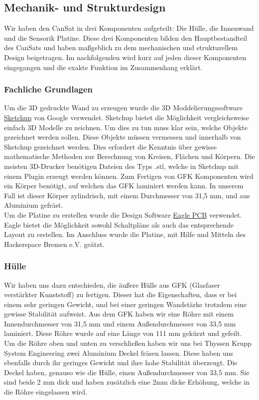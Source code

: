 \subsection{Mechanik- und Strukturdesign}

Wir haben den CanSat in drei Komponenten aufgeteilt: Die Hülle, die Innenwand und die Sensorik Platine. Diese drei Komponenten bilden den Hauptbestandteil des CanSats und haben maßgeblich zu dem mechanischen und strukturellem Design beigetragen. Im nachfolgenden wird kurz auf jeden dieser Komponenten eingegangen und die exakte Funktion im Zusammenhang erklärt.

\subsubsection{Fachliche Grundlagen}
Um die 3D gedruckte Wand zu erzeugen wurde die 3D Moddelierungssoftware \href{http://www.sketchup.com/de} {Sketchup} von Google verwendet. Sketchup bietet die Möglichkeit vergleichsweise einfach 3D Modelle zu zeichnen. Um dies zu tun muss klar sein, welche Objekte gezeichnet werden sollen. Diese Objekte müssen vermessen und innerhalb von Sketchup gezeichnet werden. Dies erfordert die Kenntnis über gewisse mathematische Methoden zur Berechnung von Kreisen, Flächen und Körpern. Die meisten 3D-Drucker benötigen Dateien des Typs .stl, welche in Sketchup mit einem Plugin erzeugt werden können.
Zum Fertigen von GFK Komponenten wird ein Körper benötigt, auf welchen das GFK laminiert werden kann. In unserem Fall ist dieser Körper zylindrisch, mit einem Durchmesser von 31,5 mm, und aus Aluminium gefräst. \\
Um die Platine zu erstellen wurde die Design Software \href{http://www.cadsoft.de/eagle-pcb-design-software/} {Eagle PCB} verwendet. Eagle bietet die Möglichkeit sowohl Schaltpläne als auch das entsprechende Layout zu erstellen. Im Anschluss wurde die Platine, mit Hilfe und Mitteln des Hackerspace Bremen e.V. geätzt.

\subsubsection{Hülle}
Wir haben uns dazu entschieden, die äußere Hülle aus GFK (Glasfaser verstärkter Kunststoff) zu fertigen. Dieser hat die Eigenschaften, dass er bei einem sehr geringen Gewicht, und bei einer geringen Wandstärke trotzdem eine gewisse Stabilität aufweist. Aus dem GFK haben wir eine Röhre mit einem Innendurchmesser von 31,5 mm und einem Außendurchmesser von 33,5 mm laminiert. Diese Röhre wurde auf eine Länge von 111 mm gekürzt und gefeilt. Um die Röhre oben und unten zu verschließen haben wir uns bei Thyssen Krupp System Engineering zwei Aluminium Deckel fräsen lassen. Diese haben uns ebenfalls durch ihr geringes Gewicht und ihre hohe Stabilität überzeugt. Die Deckel haben, genauso wie die Hülle, einen Außendurchmesser von 33,5 mm. Sie sind beide 2 mm dick und haben zusätzlich eine 2mm dicke Erhöhung, welche in die Röhre eingelassen wird.

